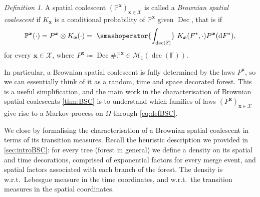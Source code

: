 \documentclass[reqno,draft]{amsart}
\numberwithin{equation}{section}
\theoremstyle{plain}
\theoremstyle{remark}
\newtheorem{definition}[theorem]{Definition}
\newcommand{\A}{\mathcal{A}} %
\renewcommand{\P}{\mathbb{P}} %
\newcommand*\diff{\mathop{}\!\mathrm{d}}
\DeclareMathOperator{\dcb}{dec}
\DeclareMathOperator{\dc}{Dec}
\newcommand{\smashop}[1]{\,\,\smashoperator{#1}\,\,}
\begin{document}

\begin{definition}\label{def:BSC}
    A spatial coalescent $(\P^{\boldsymbol x})_{\boldsymbol x\in \mathcal{X}}$ is called a \emph{Brownian spatial coalescent} if $K_{\boldsymbol x}$ is a conditional probability of $\P^{\boldsymbol x}$ given $\dc$, that is if
    \begin{equation}\label{eq:defBSC}
        \P^{\boldsymbol x}(\cdot ) = P^{\boldsymbol x} \otimes K_{\boldsymbol x}(\cdot ) = \smashop{\int_{\dcb(\mathbb{F})}} K_{\boldsymbol x}(F^\star,\cdot ) P^{\boldsymbol x}(\diff F^\star),
    \end{equation}
    for every $\boldsymbol x\in \mathcal{X}$, where $P^{\boldsymbol x} \coloneqq \dc \# \P^{\boldsymbol x} \in \mathcal{M}_1(\dcb(\mathbb{F}))$.
\end{definition}
In particular, a Brownian spatial coalescent is fully determined by the laws $P^{\boldsymbol x}$, so we can essentially think of it as a random, time and space decorated forest. This is a useful simplification, and the main work in the characterisation of Brownian spatial coalescents \cref{thm:BSC} is to understand which families of laws $(P^{\boldsymbol x})_{\boldsymbol x\in \mathcal{X}}$ give rise to a Markov process on $\Omega$ through \cref{eq:defBSC}.

We close by formalising the characterisation of a Brownian spatial coalescent in terms of its transition measures. Recall the heuristic description we provided in \cref{sec:introBSC}: for every tree (forest in general) we define a density on its spatial and time decorations, comprised of exponential factors for every merge event, and spatial factors associated with each branch of the forest. The density is w.r.t.\ Lebesgue measure in the time coordinates, and w.r.t.\ the transition measures in the spatial coordinates.
\end{document}
